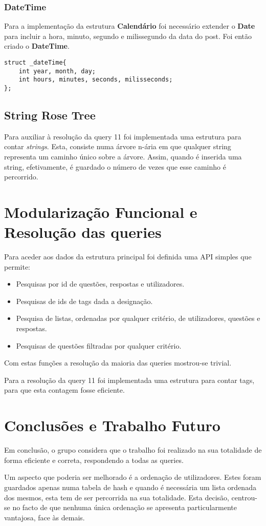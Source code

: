 \documentclass[10pt,a4paper]{article}
\begin{document}
        \subsubsection{DateTime}
        Para a implementação da estrutura \textbf{Calendário} foi necessário
        extender o \textbf{Date} para incluir a hora, minuto, segundo e
        milissegundo da data do post. Foi então criado o \textbf{DateTime}.
    \begin{verbatim}
struct _dateTime{
    int year, month, day;
    int hours, minutes, seconds, milisseconds;
};
    \end{verbatim}

    \subsection{String Rose Tree}
    Para auxiliar à resolução da query 11 foi implementada uma estrutura para
    contar \textit{strings}. Esta, consiste numa árvore n-ária em que qualquer
    string representa um caminho único sobre a árvore. Assim, quando é inserida
    uma string, efetivamente, é guardado o número de vezes que esse caminho é
    percorrido.

\section{Modularização Funcional e Resolução das queries}
    Para aceder aos dados da estrutura principal foi definida uma API
    simples que permite:
    \begin{itemize}
        \item Pesquisas por id de questões, respostas e utilizadores.
        \item Pesquisas de ids de tags dada a designação.
        \item Pesquisa de listas, ordenadas por qualquer critério, de
              utilizadores, questões e respostas.
        \item Pesquisas de questões filtradas por qualquer critério.
    \end{itemize}

    Com estas funções a resolução da maioria das queries mostrou-se
    trivial.

    Para a resolução da query 11 foi implementada uma estrutura para contar tags,
    para que esta contagem fosse eficiente.

\section{Conclusões e Trabalho Futuro}
    Em conclusão, o grupo considera que o trabalho foi realizado na sua
    totalidade de forma eficiente e correta, respondendo a todas as queries.

    Um aspecto que poderia ser melhorado é a ordenação de utilizadores. Estes
    foram guardados apenas numa tabela de hash e quando é necessária um lista
    ordenada dos mesmos, esta tem de ser percorrida na sua totalidade. Esta
    decisão, centrou-se no facto de que nenhuma única ordenação se apresenta
    particularmente vantajosa, face às demais.
\end{document}
